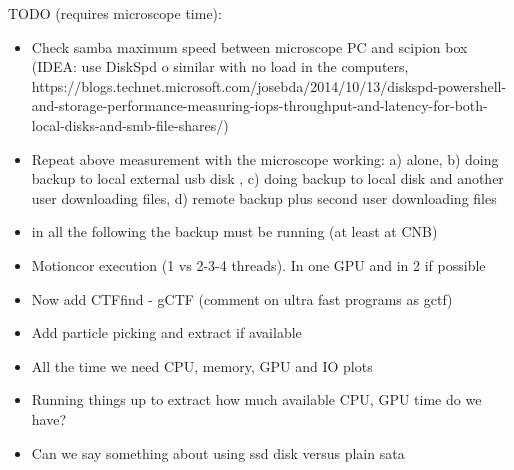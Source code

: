 \noindent
TODO (requires microscope time):
\begin{itemize}
   \item Check samba maximum speed between microscope PC and scipion box (IDEA: use DiskSpd o similar with no load in the computers, https://blogs.technet.microsoft.com/josebda/2014/10/13/diskspd-powershell-and-storage-performance-measuring-iops-throughput-and-latency-for-both-local-disks-and-smb-file-shares/)
   
   \item Repeat above measurement with the  microscope working: a) alone, b) doing backup to local external usb disk , c) doing backup to local disk and another user downloading files, d) remote backup plus second user downloading files
   
   \item in all the following the backup must be running (at least at CNB)
   
   \item Motioncor execution (1 vs 2-3-4 threads). In one GPU and in 2 if possible
   
   \item Now add CTFfind - gCTF (comment on ultra fast programs as gctf)
   
   \item Add particle picking and extract if available
   
   \item All the time we need CPU, memory, GPU and IO plots
      
   \item Running things up to extract  how much available CPU, GPU time do we have?
   
   \item Can we say something about using ssd disk versus plain sata
   
\end{itemize}
   

